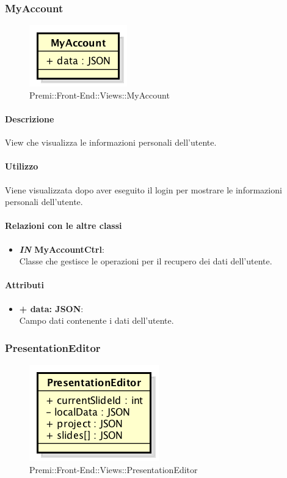 \subsubsection{MyAccount}
	\begin{figure}[h]
		\centering
		\includegraphics[width=0.3\linewidth]{img/premi_front_end_views_myaccount}
		\caption[Premi::Front-End::Views::MyAccount]{Premi::Front-End::Views::MyAccount}
	\end{figure}
	
	\paragraph{Descrizione}
	View che visualizza le informazioni personali dell'utente.
	
	\paragraph{Utilizzo}
	Viene visualizzata dopo aver eseguito il login per mostrare le informazioni personali dell'utente.
	
	\paragraph{Relazioni con le altre classi}
	\begin{itemize}
		\item \textbf{\textit{IN} MyAccountCtrl}:\\
		Classe che gestisce le operazioni per il recupero dei dati dell'utente.
	\end{itemize}
	
	\paragraph{Attributi}
	\begin{itemize}
		\item \textbf{+ data: JSON}:\\
		Campo dati contenente i dati dell'utente.
	\end{itemize}
\newpage
	
	
\subsubsection{PresentationEditor}
	\begin{figure}[h]
		\centering
		\includegraphics[width=0.3\linewidth]{img/premi_front_end_views_presentationeditor}
		\caption[Premi::Front-End::Views::PresentationEditor]{Premi::Front-End::Views::PresentationEditor}
	\end{figure}
	
